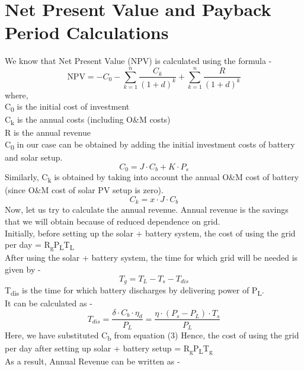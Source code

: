 \documentclass{article}
\begin{document}
\section{Net Present Value and Payback Period Calculations}
We know that Net Present Value (NPV) is calculated using the formula -\\
\begin{equation}
	\text{NPV} = -C_0 - \sum_{k=1}^{n} \frac{C_k}{(1+d)^k} + \sum_{k=1}^{n} \frac{R}{(1+d)^k}
\end{equation}
where,\\
C\textsubscript{0} is the initial cost of investment\\
C\textsubscript{k} is the annual costs (including O\&M costs)\\
R is the annual revenue\\
\newline
C\textsubscript{0} in our case can be obtained by adding the initial investment costs of battery and solar setup.\\
\[
  C_0 = J \cdot C_b + K \cdot P_s
\]
\newline
Similarly, C\textsubscript{k} is obtained by taking into account the annual O\&M cost of battery (since O\&M cost of  solar PV setup is zero).\\
\[
  C_k = x \cdot J \cdot C_b
\]
\newline
Now, let us try to calculate the annual revenue. Annual revenue is the savings that we will obtain because of reduced dependence on grid.\\
Initially, before setting up the solar + battery system, the cost of using the grid per day = R\textsubscript{g}P\textsubscript{L}T\textsubscript{L}\\
After using the solar + battery system, the time for which grid will be needed is given by -\\
\[
  T_g = T_L - T_s - T_{dis}
\]
T\textsubscript{dis} is the time for which battery discharges by delivering power of P\textsubscript{L}.\\
It can be calculated as -\\
\[
  T_{dis} = \frac{\delta \cdot C_b \cdot \eta_d}{P_L} = \frac{\eta \cdot (P_s - P_L) \cdot T_s}{P_L}
\]
Here, we have substituted C\textsubscript{b} from equation (3)
\newline
Hence, the cost of using the grid per day after setting up solar + battery setup = R\textsubscript{g}P\textsubscript{L}T\textsubscript{g}\\
As a result, Annual Revenue can be written as -\\
\end{document}
